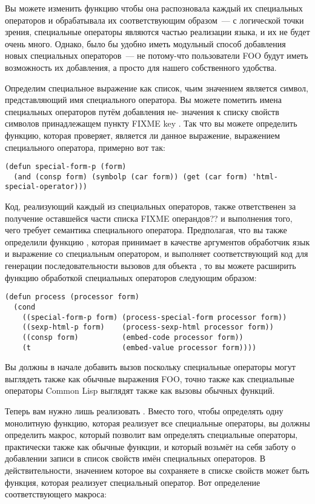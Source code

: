 Вы можете изменить функцию  чтобы она распозновала каждый их
специальных операторов и обрабатывала их соответствующим образом~--- с логической точки
зрения, специальные операторы являются частью реализации языка, и их не будет очень
много. Однако, было бы удобно иметь модульный способ добавления новых специальных
операторов~--- не потому-что пользователи FOO будут иметь возможность их добавления, а
просто для нашего собственного удобства.

Определим специальное выражение как список, чьим значением  является символ,
представляющий имя специального оператора.  Вы можете пометить имена специальных
операторов путём добавления не- значения к списку свойств символов принадлежащем
пункту FIXME key .  Так что вы можете определить функцию,
которая проверяет, является ли данное выражение, выражением специального оператора,
примерно вот так:

\begin{lstlisting}
(defun special-form-p (form)
  (and (consp form) (symbolp (car form)) (get (car form) 'html-special-operator)))
\end{lstlisting}

Код, реализующий каждый из специальных операторов, также ответственен за получение
оставшейся части списка FIXME операндов?? и выполнения того, чего требует семантика
специального оператора.  Предполагая, что вы также определили функцию
, которая принимает в качестве аргументов обработчик язык и
выражение со специальным оператором, и выполняет соответствующий код для генерации
последовательности вызовов для объекта , то вы можете расширить функцию
 обработкой специальных операторов следующим образом:

\begin{lstlisting}
(defun process (processor form)
  (cond
    ((special-form-p form) (process-special-form processor form))
    ((sexp-html-p form)    (process-sexp-html processor form))
    ((consp form)          (embed-code processor form))
    (t                     (embed-value processor form))))
\end{lstlisting}

Вы должны в начале добавить вызов  поскольку специальные операторы
могут выглядеть также как обычные выражения FOO, точно также как специальные операторы
Common Lisp выглядят также как вызовы обычных функций.

Теперь вам нужно лишь реализовать .  Вместо того, чтобы
определять одну монолитную функцию, которая реализует все специальные операторы, вы должны
определить макрос, который позволит вам определять специальные операторы, практически
также как обычные функции, и который возьмёт на себя заботу о добавлении записи
 в список свойств имён специальных операторов.  В
действительности, значением которое вы сохраняете в списке свойств может быть функция,
которая реализует специальный оператор.  Вот определение соответствующего макроса:

